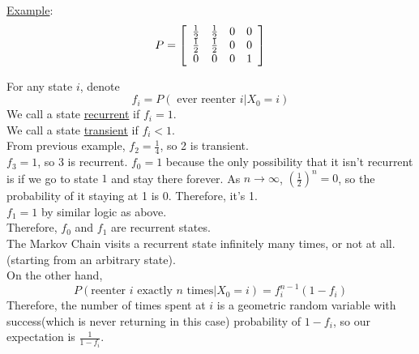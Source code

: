   \noindent\underline{Example}:
    $$
      P = \left[\begin{array}{c c c c}
        \frac{1}{2} & \frac{1}{2} & 0 & 0\\
        \frac{1}{2} & \frac{1}{2} & 0 & 0\\
        0 & 0 & 0 & 1\\
      \end{array}\right]
    $$

  For any state $i$, denote
  $$
    f_i = P(\text{ ever reenter } i | X_0 = i)
  $$
  We call a state \underline{recurrent} if $f_i = 1$.\\
  We call a state \underline{transient} if $f_i < 1$.\\

  \noindent From previous example, $f_2 = \frac{1}{4}$, so 2 is 
    transient.\\
    $f_3 = 1$, so 3 is recurrent.
    $f_0 = 1$ because the only possibility that it isn't recurrent
      is if we go to state $1$ and stay there forever. As $n \to
      \infty$, $\left(\frac{1}{2}\right)^n = 0$, so the probability
      of it staying at 1 is 0. Therefore, it's 1.\\
    $f_1 = 1$ by similar logic as above.\\
    Therefore, $f_0$ and $f_1$ are recurrent states.\\

  The Markov Chain visits a recurrent state infinitely many times, or
  not at all. (starting from an arbitrary state).\\
  On the other hand,
  $$
    P(\text{reenter $i$ exactly $n$ times} | X_0 = i) = f_i^{n-1}(1 - f_i)
  $$
  Therefore, the number of times spent at $i$ is a geometric random variable
  with success(which is never returning in this case) probability of
  $1 - f_i$, so our expectation is $\frac{1}{1-f_i}$.
